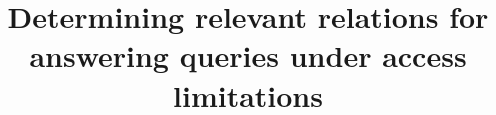\documentclass[acmtods]{acmtrans2m}
\title{Determining relevant relations for answering queries under access limitations}
\begin{document}

\begin{bottomstuff}
\end{bottomstuff}






% 
% 

% 
% 
% 


% 

\begin{received} 
\end{received} 
\end{document}
